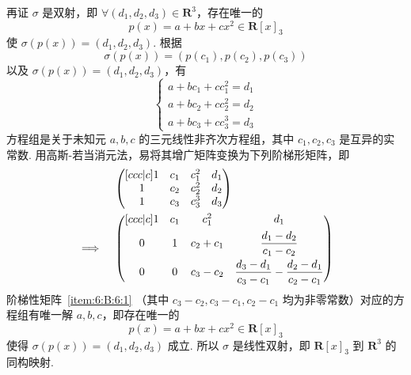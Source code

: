 \documentclass[UTF8,12pt,a4paper,fontset=fandol]{ctexart}
\begin{document}
\begin{solve}
          再证 $ \sigma $ 是双射，即 $ \forall (d_1, d_2, d_3) \in \mathbf{R}^3 $，存在唯一的
          \[ p(x) = a + bx + cx^2 \in \mathbf{R}[x]_3 \]
          使 $ \sigma(p(x)) = (d_1, d_2, d_3) $. 根据
          \[ \sigma(p(x)) = (p(c_1), p(c_2), p(c_3)) \]
          以及 $ \sigma(p(x)) = (d_1, d_2, d_3) $，有
          \[ \begin{cases}
                  a + bc_1 + cc_1^2 = d_1 \\
                  a + bc_2 + cc_2^2 = d_2 \\
                  a + bc_3 + cc_3^3 = d_3
              \end{cases} \]
          方程组是关于未知元 $ a, b, c $ 的三元线性非齐次方程组，其中 $ c_1, c_2, c_3 $ 是互异的实常数. 用高斯-若当消元法，易将其增广矩阵变换为下列阶梯形矩阵，即
          \begin{align}
                             & \begin{pmatrix}[ccc|c]
                                   1 & c_1 & c_1^2 & d_1 \\
                                   1 & c_2 & c_2^2 & d_2 \\
                                   1 & c_3 & c_3^3 & d_3
                               \end{pmatrix} \notag                                                                    \\
              \implies \quad & \begin{pmatrix}[ccc|c]
                                   1 & c_1 & c_1^2     & d_1                                                         \\[1ex]
                                   0 & 1   & c_2 + c_1 & \dfrac{d_1 - d_2}{c_1 - c_2}                                \\[2ex]
                                   0 & 0   & c_3 - c_2 & \dfrac{d_3 - d_1}{c_3 - c_1} - \dfrac{d_2 - d_1}{c_2 - c_1}
                               \end{pmatrix} \label{item:6:B:6:1}
          \end{align}
          阶梯性矩阵~\eqref{item:6:B:6:1} （其中 $ c_3 - c_2, c_3 - c_1, c_2 - c_1 $ 均为非零常数）对应的方程组有唯一解 $ a, b, c $，即存在唯一的
          \[ p(x) = a + bx + cx^2 \in \mathbf{R}[x]_3 \]
          使得 $ \sigma(p(x)) = (d_1, d_2, d_3) $ 成立. 所以 $ \sigma $ 是线性双射，即 $ \mathbf{R}[x]_3 $ 到 $ \mathbf{R}^3 $ 的同构映射.
\end{solve}
\end{document}
